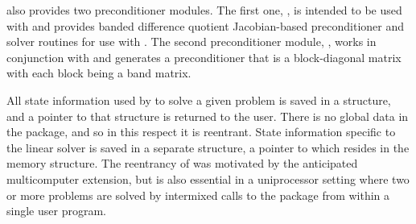 {\cvodes} also provides two preconditioner modules. The first one, 
{\cvbandpre}, is intended to be used with {\nvecs} and provides
banded difference quotient Jacobian-based preconditioner and solver
routines for use with {\cvspgmr}. The second preconditioner module, 
{\cvbbdpre}, works in conjunction with {\nvecp} and generates a 
preconditioner that is a block-diagonal matrix with each block being 
a band matrix.

All state information used by {\cvodes} to solve a given problem is saved
in a structure, and a pointer to that structure is returned to the
user.  There is no global data in the {\cvodes} package, and so in this
respect it is reentrant. State information specific to the linear
solver is saved in a separate structure, a pointer to which resides in
the {\cvodes} memory structure. The reentrancy of {\cvodes} was motivated
by the anticipated multicomputer extension, but is also essential
in a uniprocessor setting where two or more problems are solved by
intermixed calls to the package from within a single user program.

